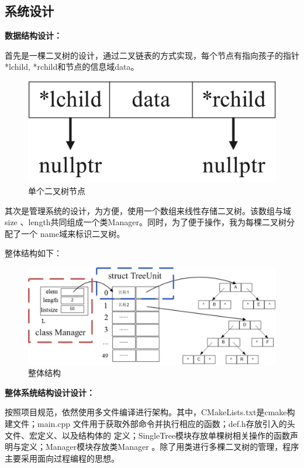 \documentclass[supercite]{Experimental_Report}
\theoremstyle{definition}
\begin{document}
\subsection{系统设计}
	\noindent \textbf{数据结构设计：}\par
	首先是一棵二叉树的设计，通过二叉链表的方式实现，每个节点有指向孩子的指针*lchild,
	*rchild和节点的信息域data。
	\begin{figure}[H]
		\centering
		\includegraphics{images/单个二叉树节点.png}
		\caption{单个二叉树节点}
	\end{figure}
	其次是管理系统的设计，为方便，使用一个数组来线性存储二叉树。该数组与域size
	、length共同组成一个类Manager。同时，为了便于操作，我为每棵二叉树分配了一个
	name域来标识二叉树。\par
	整体结构如下：\par
	\begin{figure}[H]
		\centering
		\includegraphics[scale=0.7]{images/二叉树管理系统结构.png}
		\caption{整体结构}
	\end{figure}
	\noindent \textbf{整体系统结构设计设计：}\par
	按照项目规范，依然使用多文件编译进行架构。其中，CMakeLists.txt是cmake构建文件；main.cpp
	文件用于获取外部命令并执行相应的函数；def.h存放引入的头文件、宏定义、以及结构体的
	定义；SingleTree模块存放单棵树相关操作的函数声明与定义；Manager模块存放类Manager
	。除了用类进行多棵二叉树的管理，程序主要采用面向过程编程的思想。
\end{document}
